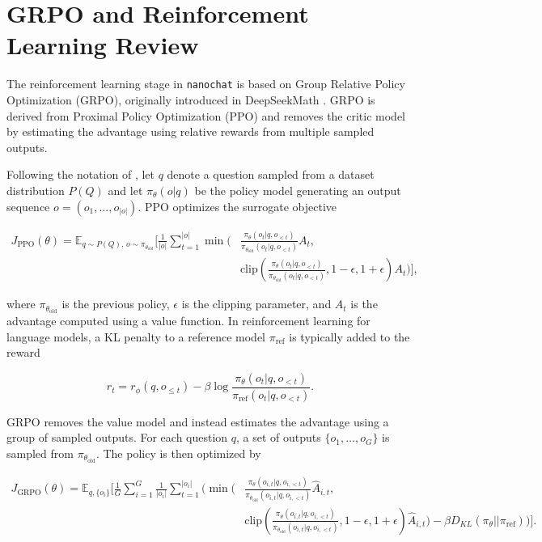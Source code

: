 \section{GRPO and Reinforcement Learning Review}

The reinforcement learning stage in \texttt{nanochat} is based on Group Relative Policy Optimization (GRPO), originally introduced in DeepSeekMath \cite{shao2024deepseekmath}. GRPO is derived from Proximal Policy Optimization (PPO) and removes the critic model by estimating the advantage using relative rewards from multiple sampled outputs.

Following the notation of \cite{shao2024deepseekmath}, let $q$ denote a question sampled from a dataset distribution $P(Q)$ and let $\pi_\theta(o|q)$ be the policy model generating an output sequence $o=(o_1,\dots,o_{|o|})$. PPO optimizes the surrogate objective

\begin{align}
J_{\mathrm{PPO}}(\theta) =
\mathbb{E}_{q \sim P(Q),\, o \sim \pi_{\theta_{\mathrm{old}}}}
\Bigg[
\frac{1}{|o|}
\sum_{t=1}^{|o|}
\min
\Big(
&\frac{\pi_\theta(o_t|q,o_{<t})}
     {\pi_{\theta_{\mathrm{old}}}(o_t|q,o_{<t})} A_t, \\
&\mathrm{clip}\!\left(
\frac{\pi_\theta(o_t|q,o_{<t})}
     {\pi_{\theta_{\mathrm{old}}}(o_t|q,o_{<t})},
1-\epsilon,1+\epsilon
\right) A_t
\Big)
\Bigg],
\end{align}

where $\pi_{\theta_{\mathrm{old}}}$ is the previous policy, $\epsilon$ is the clipping parameter, and $A_t$ is the advantage computed using a value function. In reinforcement learning for language models, a KL penalty to a reference model $\pi_{\mathrm{ref}}$ is typically added to the reward

\begin{equation}
r_t =
r_\phi(q,o_{\le t})
-
\beta
\log
\frac{\pi_\theta(o_t|q,o_{<t})}
{\pi_{\mathrm{ref}}(o_t|q,o_{<t})}.
\end{equation}

GRPO removes the value model and instead estimates the advantage using a group of sampled outputs. For each question $q$, a set of outputs $\{o_1,\dots,o_G\}$ is sampled from $\pi_{\theta_{\mathrm{old}}}$. The policy is then optimized by

\begin{align}
J_{\mathrm{GRPO}}(\theta) =
\mathbb{E}_{q,\{o_i\}}
\Bigg[
\frac{1}{G}
\sum_{i=1}^{G}
\frac{1}{|o_i|}
\sum_{t=1}^{|o_i|}
\Bigg(
\min
\Big(
&\frac{\pi_\theta(o_{i,t}|q,o_{i,<t})}
     {\pi_{\theta_{\mathrm{old}}}(o_{i,t}|q,o_{i,<t})}
     \hat A_{i,t}, \\
&\mathrm{clip}\!\left(
\frac{\pi_\theta(o_{i,t}|q,o_{i,<t})}
     {\pi_{\theta_{\mathrm{old}}}(o_{i,t}|q,o_{i,<t})},
1-\epsilon,1+\epsilon
\right)
\hat A_{i,t}
\Big)
-
\beta D_{KL}(\pi_\theta||\pi_{\mathrm{ref}})
\Bigg)
\Bigg].
\end{align}

